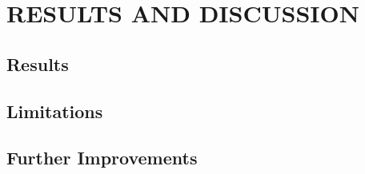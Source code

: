 \documentclass[main]{subfiles}
\begin{document}
\chapter{RESULTS AND DISCUSSION}

\section{Results}


\section{Limitations}

\section{Further Improvements}
\end{document}
